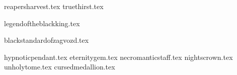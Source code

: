 
\raggedcolumns
\begin{multicols}{2}

\subtitle{\weaponenchantments}
\startsortedpricelist

{reapersharvest.tex}
{truethirst.tex}

\endsortedpricelist

\subtitle{\armourenchantments}
\startsortedpricelist

{legendoftheblackking.tex}

\endsortedpricelist

\subtitle{\bannerenchantments}
\startsortedpricelist

{blackstandardofzagvozd.tex}

\endsortedpricelist

\subtitle{\artefacts}
\startsortedpricelist

{hypnoticpendant.tex}
{eternitygem.tex}
{necromanticstaff.tex}
{nightscrown.tex}
{unholytome.tex}
{cursedmedallion.tex}

\endsortedpricelist
\end{multicols}
